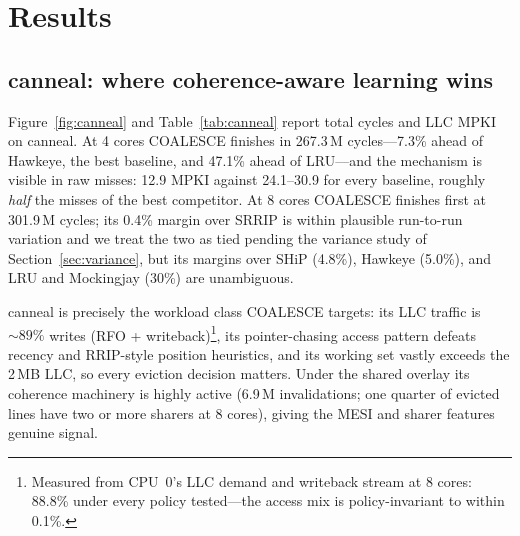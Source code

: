 \documentclass[conference]{IEEEtran}
\begin{document}
\section{Results}
\label{sec:results}

\subsection{canneal: where coherence-aware learning wins}
\label{sec:canneal}

Figure~\ref{fig:canneal} and Table~\ref{tab:canneal} report total cycles and LLC MPKI on canneal. At 4 cores COALESCE finishes in 267.3\,M cycles---7.3\% ahead of Hawkeye, the best baseline, and 47.1\% ahead of LRU---and the mechanism is visible in raw misses: 12.9 MPKI against 24.1--30.9 for every baseline, roughly \emph{half} the misses of the best competitor. At 8 cores COALESCE finishes first at 301.9\,M cycles; its 0.4\% margin over SRRIP is within plausible run-to-run variation and we treat the two as tied pending the variance study of Section~\ref{sec:variance}, but its margins over SHiP (4.8\%), Hawkeye (5.0\%), and LRU and Mockingjay (30\%) are unambiguous.

canneal is precisely the workload class COALESCE targets: its LLC traffic is ${\sim}89\%$ writes (RFO + writeback)\footnote{Measured from CPU~0's LLC demand and writeback stream at 8 cores: 88.8\% under every policy tested---the access mix is policy-invariant to within 0.1\%.}, its pointer-chasing access pattern defeats recency and RRIP-style position heuristics, and its working set vastly exceeds the 2\,MB LLC, so every eviction decision matters. Under the shared overlay its coherence machinery is highly active (6.9\,M invalidations; one quarter of evicted lines have two or more sharers at 8 cores), giving the MESI and sharer features genuine signal.
\end{document}

